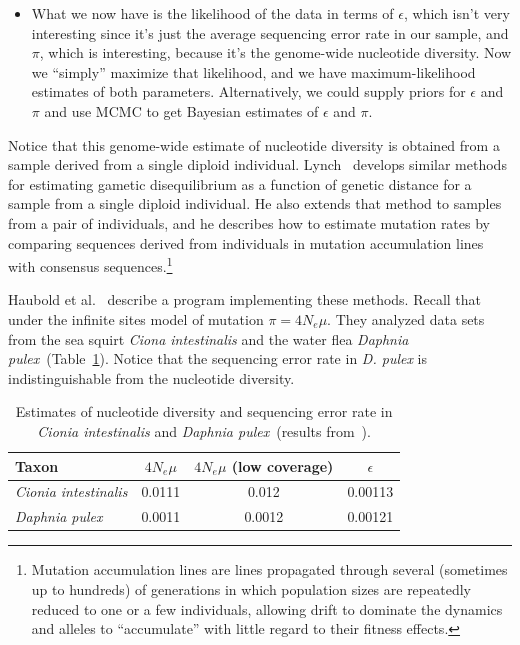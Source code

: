 \begin{itemize}
\item What we now have is the likelihood of the data in terms of
  $\epsilon$, which isn't very interesting since it's just the average
  sequencing error rate in our sample, and $\pi$, which is
  interesting, because it's the genome-wide nucleotide diversity. Now
  we ``simply'' maximize that likelihood, and we have
  maximum-likelihood estimates of both parameters. Alternatively, we
  could supply priors for $\epsilon$ and $\pi$ and use MCMC to get
  Bayesian estimates of $\epsilon$ and $\pi$.  

\end{itemize}

Notice that this genome-wide estimate of nucleotide diversity is
obtained from a sample derived from a single diploid
individual. Lynch~\cite{Lynch-2008} develops similar methods for
estimating gametic disequilibrium as a function of genetic distance
for a sample from a single diploid individual. He also extends that
method to samples from a pair of individuals, and he describes how to
estimate mutation rates by comparing sequences derived from
individuals in mutation accumulation lines with consensus
sequences.\footnote{Mutation accumulation lines are lines propagated
  through several (sometimes up to hundreds) of generations in which
  population sizes are repeatedly reduced to one or a few individuals,
  allowing drift to dominate the dynamics and alleles to
  ``accumulate'' with little regard to their fitness effects.}

Haubold et al.~\cite{Haubold-etal-2010} describe a program
implementing these methods. Recall that under the infinite sites model
of mutation $\pi = 4N_e\mu$. They analyzed data sets from the sea
squirt {\it Ciona intestinalis\/} and the water flea {\it Daphnia
  pulex}~(Table~\ref{table:NGS-results}). Notice that the sequencing
error rate in {\it D. pulex} is indistinguishable from the nucleotide
diversity.

\begin{table}
\begin{center}
\begin{tabular}{lccc}
\hline\hline
Taxon & $4N_e\mu$ & $4N_e\mu$ (low coverage) & $\epsilon$ \\
\hline
{\it Cionia intestinalis} & 0.0111 & 0.012 & 0.00113 \\
{\it Daphnia pulex} & 0.0011 & 0.0012 & 0.00121 \\
\hline
\end{tabular}
\end{center}
\caption{Estimates of nucleotide diversity and sequencing error rate
  in {\it Cionia intestinalis\/} and {\it Daphnia pulex}~(results
  from~\cite{Haubold-etal-2010}).}\label{table:NGS-results}
\end{table}

